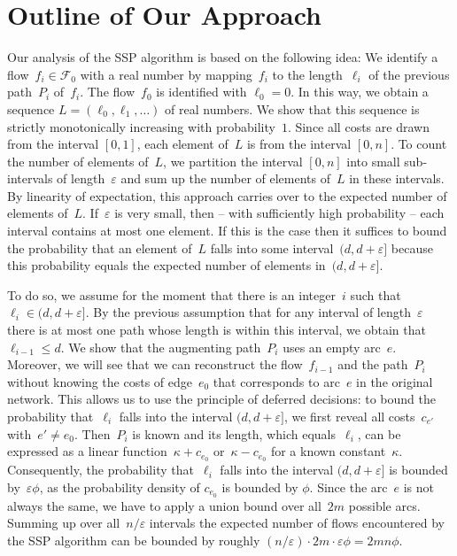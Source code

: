 \documentclass[11pt]{article}
\newcommand{\F}{\mathcal{F}}
\newcommand{\e}{\varepsilon}
\begin{document}
\section{Outline of Our Approach}

Our analysis of the SSP algorithm is based on the following idea: We identify a flow~$f_i \in \F_0$ with a real number by mapping~$f_i$ to the length~$\ell_i$ of the previous path~$P_i$ of~$f_i$. The flow~$f_0$ is identified with $\ell_0 = 0$. In this way,
we obtain a sequence $L = (\ell_0, \ell_1, \ldots)$ of real numbers. We show that this sequence is strictly monotonically increasing with probability~$1$. Since all costs are drawn from the interval $[0, 1]$, each element of~$L$ is from the interval $[0, n]$. To count the number of elements of~$L$, we partition the interval $[0, n]$ into small sub-intervals of length~$\e$ and sum up the number of elements of~$L$ in these intervals. By linearity of expectation, this approach carries over to the expected number of elements of~$L$. If~$\e$ is very small, then -- with sufficiently high probability -- each interval contains at most one element. 
If this is the case then it suffices to bound the probability that an element of~$L$ falls into some interval~$(d, d+\e]$ because
this probability equals the expected number of elements in~$(d, d+\e]$.

To do so, we assume for the moment that there is an integer~$i$ such that $\ell_i \in (d, d+\e]$.
By the previous assumption that for any interval of length~$\e$ there is at most
one path whose length is within this interval, we obtain that $\ell_{i-1} \leq
d$. We show that the augmenting path~$P_i$ uses an empty arc~$e$. Moreover, we
will see that we can reconstruct the flow~$f_{i-1}$ and the path~$P_i$ without knowing the costs of
edge~$e_0$ that corresponds to arc~$e$ in the original network.
This allows us to use the principle of deferred decisions: to bound the probability that~$\ell_i$ falls into the interval $(d, d+\e]$, we first reveal all costs~$c_{e'}$
with~$e'\neq e_0$. Then~$P_i$ is known and its length, which equals~$\ell_i$, can be expressed
as a linear function~$\kappa+c_{e_0}$ or~$\kappa-c_{e_0}$ for a known constant~$\kappa$. 
Consequently, the probability that~$\ell_i$ falls into the interval $(d, d+\e]$ is bounded by~$\e\phi$, as the probability density of $c_{e_0}$ is bounded by $\phi$.
Since the arc~$e$ is not always the same, we have to apply a union bound over all~$2m$ possible arcs. Summing up over all~$n/\e$ intervals the expected number of flows encountered by the SSP algorithm can be bounded by roughly $(n/\e) \cdot 2m \cdot \e\phi = 2mn\phi$.
\end{document}
